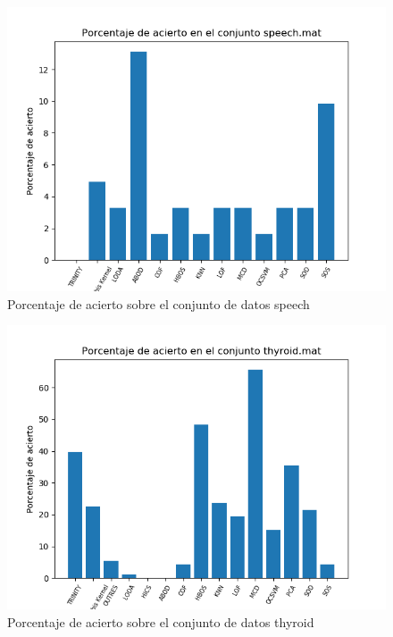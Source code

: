 \begin{figure}[H]
	\centering
	\includegraphics[scale=0.7]{imagenes/imgs-exp1/accuracy/speech}
	\caption{Porcentaje de acierto sobre el conjunto de datos speech}
	\label{speech_accuracy}
\end{figure}

\begin{figure}[H]
	\centering
	\includegraphics[scale=0.7]{imagenes/imgs-exp1/accuracy/thyroid}
	\caption{Porcentaje de acierto sobre el conjunto de datos thyroid}
	\label{thyroid_accuracy}
\end{figure}

